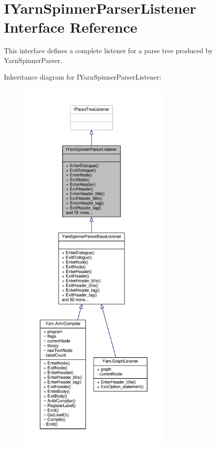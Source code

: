 \hypertarget{a00126}{\section{I\-Yarn\-Spinner\-Parser\-Listener Interface Reference}
\label{a00126}
}


This interface defines a complete listener for a parse tree produced by Yarn\-Spinner\-Parser.  




Inheritance diagram for I\-Yarn\-Spinner\-Parser\-Listener\-:
\nopagebreak
\begin{figure}[H]
\begin{center}
\leavevmode
\includegraphics[height=550pt]{a00402}
\end{center}
\end{figure}


